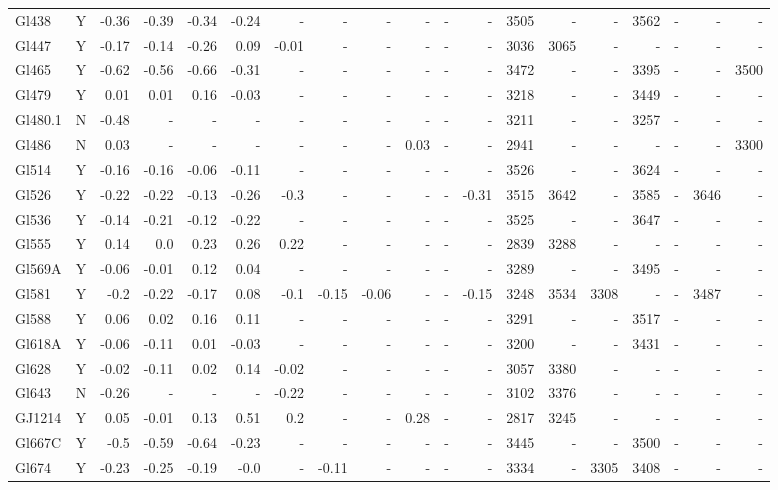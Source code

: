 \documentclass[referee]{aa}
\begin{document}
{\begin{landscape}
{\begin{longtable}{l c r r r r r r r r r r | r r r r r r r }
Gl438 & Y & -0.36 & -0.39 & -0.34 & -0.24 & - & - & - & - & - & - & 3505 & - & - & 3562 & - & - & - \\
Gl447 & Y & -0.17 & -0.14 & -0.26 & 0.09 & -0.01 & - & - & - & - & - & 3036 & 3065 & - & - & - & - & - \\
Gl465 & Y & -0.62 & -0.56 & -0.66 & -0.31 & - & - & - & - & - & - & 3472 & - & - & 3395 & - & - & 3500 \\
Gl479 & Y & 0.01 & 0.01 & 0.16 & -0.03 & - & - & - & - & - & - & 3218 & - & - & 3449 & - & - & - \\
Gl480.1 & N & -0.48 & - & - & - & - & - & - & - & - & - & 3211 & - & - & 3257 & - & - & - \\
Gl486 & N & 0.03 & - & - & - & - & - & - & 0.03 & - & - & 2941 & - & - & - & - & - & 3300 \\
Gl514 & Y & -0.16 & -0.16 & -0.06 & -0.11 & - & - & - & - & - & - & 3526 & - & - & 3624 & - & - & - \\
Gl526 & Y & -0.22 & -0.22 & -0.13 & -0.26 & -0.3 & - & - & - & - & -0.31 & 3515 & 3642 & - & 3585 & - & 3646 & - \\
Gl536 & Y & -0.14 & -0.21 & -0.12 & -0.22 & - & - & - & - & - & - & 3525 & - & - & 3647 & - & - & - \\
Gl555 & Y & 0.14 & 0.0 & 0.23 & 0.26 & 0.22 & - & - & - & - & - & 2839 & 3288 & - & - & - & - & - \\
Gl569A & Y & -0.06 & -0.01 & 0.12 & 0.04 & - & - & - & - & - & - & 3289 & - & - & 3495 & - & - & - \\
Gl581 & Y & -0.2 & -0.22 & -0.17 & 0.08 & -0.1 & -0.15 & -0.06 & - & - & -0.15 & 3248 & 3534 & 3308 & - & - & 3487 & - \\
Gl588 & Y & 0.06 & 0.02 & 0.16 & 0.11 & - & - & - & - & - & - & 3291 & - & - & 3517 & - & - & - \\
Gl618A & Y & -0.06 & -0.11 & 0.01 & -0.03 & - & - & - & - & - & - & 3200 & - & - & 3431 & - & - & - \\
Gl628 & Y & -0.02 & -0.11 & 0.02 & 0.14 & -0.02 & - & - & - & - & - & 3057 & 3380 & - & - & - & - & - \\
Gl643 & N & -0.26 & - & - & - & -0.22 & - & - & - & - & - & 3102 & 3376 & - & - & - & - & - \\
GJ1214 & Y & 0.05 & -0.01 & 0.13 & 0.51 & 0.2 & - & - & 0.28 & - & - & 2817 & 3245 & - & - & - & - & - \\
Gl667C & Y & -0.5 & -0.59 & -0.64 & -0.23 & - & - & - & - & - & - & 3445 & - & - & 3500 & - & - & - \\
Gl674 & Y & -0.23 & -0.25 & -0.19 & -0.0 & - & -0.11 & - & - & - & - & 3334 & - & 3305 & 3408 & - & - & - \\

\end{longtable}}
\end{landscape}}
\end{document}
